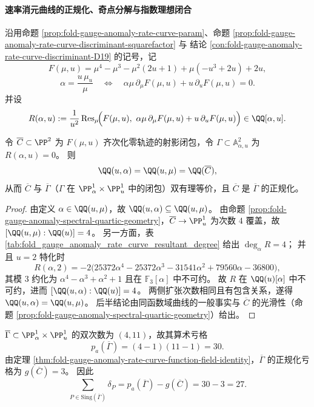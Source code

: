 \paragraph{速率消元曲线的正规化、奇点分解与指数理想闭合}\label{par:fold-gauge-anomaly-rate-curve-normalization-singularity-index}
沿用命题 \ref{prop:fold-gauge-anomaly-rate-curve-param}、命题 \ref{prop:fold-gauge-anomaly-rate-curve-discriminant-squarefactor} 与
结论 \ref{con:fold-gauge-anomaly-rate-curve-discriminant-D19} 的记号，记
\[
F(\mu,u)=\mu^{4}-\mu^{3}-\mu^{2}(2u+1)+\mu(-u^{3}+2u)+2u,
\]
\[
\alpha=\frac{u\,\mu_u}{\mu}
\quad\Longleftrightarrow\quad
\alpha\mu\,\partial_{\mu}F(\mu,u)+u\,\partial_uF(\mu,u)=0.
\]
并设
\[
R(\alpha,u):=\frac{1}{u^{2}}\operatorname{Res}_{\mu}\!\Bigl(F(\mu,u),\ \alpha\mu\,\partial_{\mu}F(\mu,u)+u\,\partial_uF(\mu,u)\Bigr)\in\QQ[\alpha,u].
\]

\begin{theorem}[速率消元曲线与谱四次的同函数域性]\label{thm:fold-gauge-anomaly-rate-curve-function-field-identity}
令 \(\overline C\subset\PP^2\) 为 \(F(\mu,u)\) 齐次化零轨迹的射影闭包，令 \(\Gamma\subset\mathbb A^2_{\alpha,u}\) 为 \(R(\alpha,u)=0\)。
则
\[
\QQ(u,\alpha)=\QQ(u,\mu)=\QQ(\overline C),
\]
从而 \(\overline C\) 与 \(\overline\Gamma\)（\(\Gamma\) 在 \(\PP^1_{\alpha}\times\PP^1_u\) 中的闭包）双有理等价，且 \(\overline C\) 是 \(\overline\Gamma\) 的正规化。
\end{theorem}

\begin{proof}
由定义 \(\alpha\in\QQ(u,\mu)\)，故 \(\QQ(u,\alpha)\subseteq \QQ(u,\mu)\)。
由命题 \ref{prop:fold-gauge-anomaly-spectral-quartic-geometry}，\(\overline C\to\PP^1_u\) 为次数 \(4\) 覆盖，故
\(
[\QQ(u,\mu):\QQ(u)]=4
\)。
另一方面，表 \ref{tab:fold_gauge_anomaly_rate_curve_resultant_degree} 给出 \(\deg_{\alpha}R=4\)；
并且 \(u=2\) 特化时
\[
R(\alpha,2)=-2\bigl(25372\alpha^4-25372\alpha^3-31541\alpha^2+79560\alpha-36800\bigr),
\]
其模 \(3\) 约化为
\(
\alpha^4-\alpha^3+\alpha^2+1
\)
且在 \(\mathbb F_3[\alpha]\) 中不可约。
故 \(R\) 在 \(\QQ(u)[\alpha]\) 中不可约，进而
\(
[\QQ(u,\alpha):\QQ(u)]=4
\)。
两侧扩张次数相同且有包含关系，遂得 \(\QQ(u,\alpha)=\QQ(u,\mu)\)。
后半结论由同函数域曲线的一般事实与 \(\overline C\) 的光滑性（命题 \ref{prop:fold-gauge-anomaly-spectral-quartic-geometry}）给出。
\end{proof}

\begin{corollary}\label{cor:fold-gauge-anomaly-rate-curve-delta-defect-27}
\(\overline\Gamma\subset\PP^1_{\alpha}\times\PP^1_u\) 的双次数为 \((4,11)\)，故其算术亏格
\[
p_a(\overline\Gamma)=(4-1)(11-1)=30.
\]
由定理 \ref{thm:fold-gauge-anomaly-rate-curve-function-field-identity}，\(\overline\Gamma\) 的正规化亏格为 \(g(\overline C)=3\)。
因此
\[
\sum_{P\in\mathrm{Sing}(\overline\Gamma)}\delta_P
=p_a(\overline\Gamma)-g(\overline C)=30-3=27.
\]
\end{corollary}

